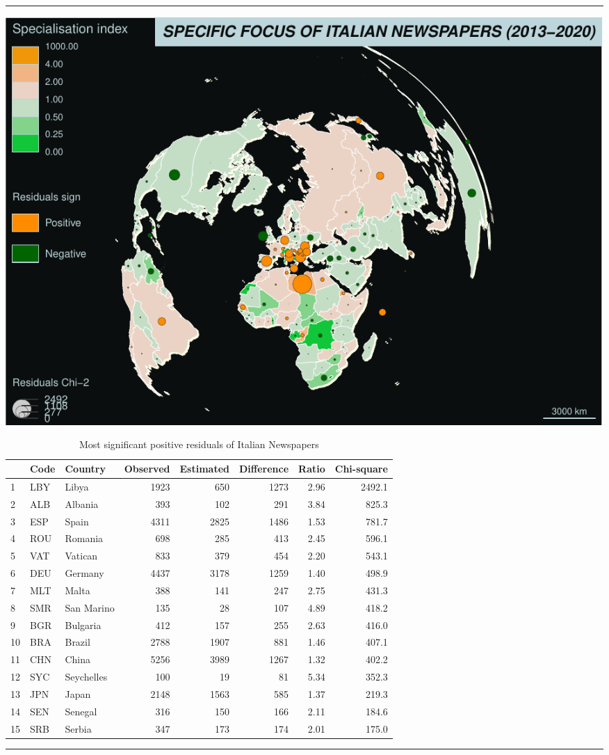 \documentclass[
]{article}
\begin{document}
\begin{center}\rule{0.5\linewidth}{0.5pt}\end{center}

\includegraphics{Part2_maps_files/figure-latex/unnamed-chunk-23-1.pdf}

\begin{table}

\caption{\label{tab:unnamed-chunk-24}Most significant positive residuals of Italian Newspapers}
\centering
\begin{tabular}[t]{l|l|l|r|r|r|r|r}
\hline
  & Code & Country & Observed & Estimated & Difference & Ratio & Chi-square\\
\hline
1 & LBY & Libya & 1923 & 650 & 1273 & 2.96 & 2492.1\\
\hline
2 & ALB & Albania & 393 & 102 & 291 & 3.84 & 825.3\\
\hline
3 & ESP & Spain & 4311 & 2825 & 1486 & 1.53 & 781.7\\
\hline
4 & ROU & Romania & 698 & 285 & 413 & 2.45 & 596.1\\
\hline
5 & VAT & Vatican & 833 & 379 & 454 & 2.20 & 543.1\\
\hline
6 & DEU & Germany & 4437 & 3178 & 1259 & 1.40 & 498.9\\
\hline
7 & MLT & Malta & 388 & 141 & 247 & 2.75 & 431.3\\
\hline
8 & SMR & San Marino & 135 & 28 & 107 & 4.89 & 418.2\\
\hline
9 & BGR & Bulgaria & 412 & 157 & 255 & 2.63 & 416.0\\
\hline
10 & BRA & Brazil & 2788 & 1907 & 881 & 1.46 & 407.1\\
\hline
11 & CHN & China & 5256 & 3989 & 1267 & 1.32 & 402.2\\
\hline
12 & SYC & Seychelles & 100 & 19 & 81 & 5.34 & 352.3\\
\hline
13 & JPN & Japan & 2148 & 1563 & 585 & 1.37 & 219.3\\
\hline
14 & SEN & Senegal & 316 & 150 & 166 & 2.11 & 184.6\\
\hline
15 & SRB & Serbia & 347 & 173 & 174 & 2.01 & 175.0\\
\hline
\end{tabular}
\end{table}

\begin{center}\rule{0.5\linewidth}{0.5pt}\end{center}
\end{document}
